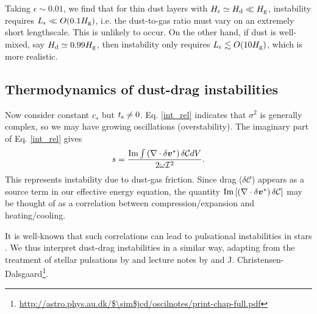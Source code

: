 Taking $\epsilon\sim 0.01$,  we find that 
for thin dust layers with $H_\epsilon \simeq H_\mathrm{d}\ll H_\mathrm{g}$,  instability
requires $L_\epsilon\ll O(0.1H_\mathrm{g})$, i.e. the dust-to-gas ratio must
vary on an extremely short lengthscale. 
This is unlikely to
occur. On the other hand, if dust is well-mixed, say $H_\mathrm{d}\simeq
0.99H_\mathrm{g}$, then instability only requires 
$L_\epsilon\lesssim O(10H_\mathrm{g})$, which is more realistic. 


\subsection{Thermodynamics of dust-drag instabilities}\label{dust_work}
Now consider constant $c_s$ but $t_\mathrm{s}\neq0$. 
Eq. \ref{int_rel} indicates that $\sigma^2$ is generally complex, so
we may have growing oscillations (overstability). %
The imaginary part of Eq. \ref{int_rel}
gives  
\begin{align}
  s = \frac{\operatorname{Im}\int \left(\nabla\cdot\delta\bm{v}^*\right)\delta\mathcal{C}dV}{2\omega\mathcal{I}^2}. \label{thermal_instability}
\end{align} 
This represents instability due to dust-gas friction. 
Since drag ($\delta \mathcal{C}$) appears as a source term in our
effective energy equation, the quantity 
$\operatorname{Im}\left[\left(\nabla\cdot\delta\bm{v}^*\right)\delta\mathcal{C}\right]$
may be thought of as a correlation between compression/expansion and  
heating/cooling.  

It is well-known that such correlations can lead to pulsational
instabilities in stars \citep{cox67}. We thus interpret  
dust-drag instabilities in a similar way, 
adapting from the treatment of stellar 
pulsations by \cite{cox67} and lecture notes by \cite{samadi15} and 
J. Christensen-Dalsgaard\footnote{\url{http://astro.phys.au.dk/$\sim$jcd/oscilnotes/print-chap-full.pdf}}.      

